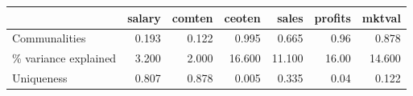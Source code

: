 \begin{tabular}{lrrrrrr}
\toprule
 & salary & comten & ceoten & sales & profits & mktval \\ 
\midrule\addlinespace[2.5pt]
Communalities & 0.193 & 0.122 & 0.995 & 0.665 & 0.96 & 0.878 \\ 
\% variance explained & 3.200 & 2.000 & 16.600 & 11.100 & 16.00 & 14.600 \\ 
Uniqueness & 0.807 & 0.878 & 0.005 & 0.335 & 0.04 & 0.122 \\ 
\bottomrule
\end{tabular}

